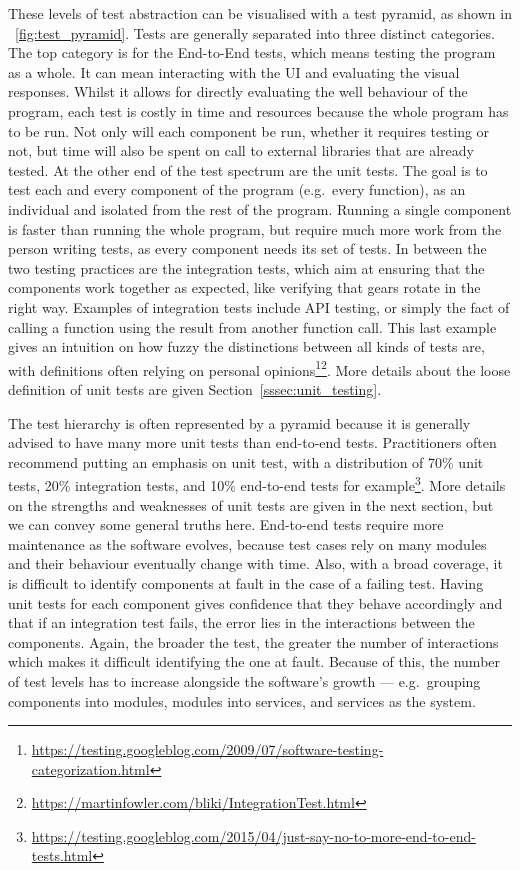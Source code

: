 \documentclass[a4paper,11pt]{sdm_internship}
\theoremstyle{definition}
\begin{document}
These levels of test abstraction can be visualised with a test pyramid, as shown in \figurename~\ref{fig:test_pyramid}.
Tests are generally separated into three distinct categories.
The top category is for the End-to-End tests, which means testing the program as a whole.
It can mean interacting with the UI and evaluating the visual responses.
Whilst it allows for directly evaluating the well behaviour of the program, each test is costly in time and resources because the whole program has to be run.
Not only will each component be run, whether it requires testing or not, but time will also be spent on call to external libraries that are already tested.
At the other end of the test spectrum are the unit tests.
The goal is to test each and every component of the program (e.g.\ every function), as an individual and isolated from the rest of the program.
Running a single component is faster than running the whole program, but require much more work from the person writing tests, as every component needs its set of tests.
In between the two testing practices are the integration tests, which aim at ensuring that the components work together as expected, like verifying that gears rotate in the right way.
Examples of integration tests include API testing, or simply the fact of calling a function using the result from another function call.
This last example gives an intuition on how fuzzy the distinctions between all kinds of tests are, with definitions often relying on personal opinions\footnote{\url{https://testing.googleblog.com/2009/07/software-testing-categorization.html}}\footnote{\url{https://martinfowler.com/bliki/IntegrationTest.html}}.
More details about the loose definition of unit tests are given Section~\ref{sssec:unit_testing}.

The test hierarchy is often represented by a pyramid because it is generally advised to have many more unit tests than end-to-end tests.
Practitioners often recommend putting an emphasis on unit test, with a distribution of 70\% unit tests, 20\% integration tests, and 10\% end-to-end tests for example\footnote{\url{https://testing.googleblog.com/2015/04/just-say-no-to-more-end-to-end-tests.html}}.
More details on the strengths and weaknesses of unit tests are given in the next section, but we can convey some general truths here.
End-to-end tests require more maintenance as the software evolves, because test cases rely on many modules and their behaviour eventually change with time.
Also, with a broad coverage, it is difficult to identify components at fault in the case of a failing test.
Having unit tests for each component gives confidence that they behave accordingly and that if an integration test fails, the error lies in the interactions between the components.
Again, the broader the test, the greater the number of interactions which makes it difficult identifying the one at fault.
Because of this, the number of test levels has to increase alongside the software's growth --- e.g.\ grouping components into modules, modules into services, and services as the system.
\end{document}
